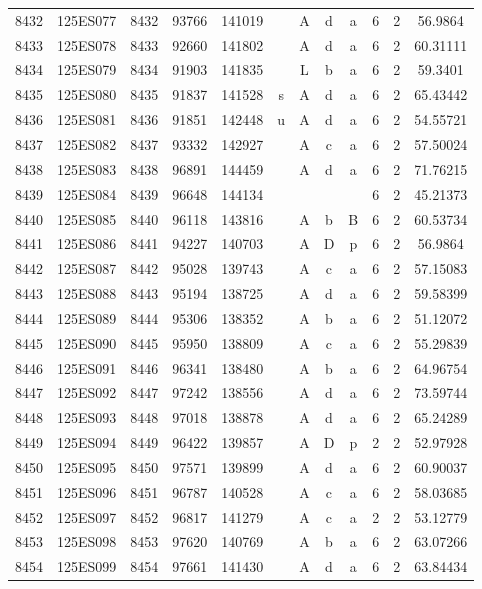 \begin{tabular}{|*{12}{c|}}
8432 & 125ES077 & 8432 & 93766 & 141019 &  & A & d & a & 6 & 2 & 56.9864 \\ 
8433 & 125ES078 & 8433 & 92660 & 141802 &  & A & d & a & 6 & 2 & 60.31111 \\ 
8434 & 125ES079 & 8434 & 91903 & 141835 &  & L & b & a & 6 & 2 & 59.3401 \\ 
8435 & 125ES080 & 8435 & 91837 & 141528 & s & A & d & a & 6 & 2 & 65.43442 \\ 
8436 & 125ES081 & 8436 & 91851 & 142448 & u & A & d & a & 6 & 2 & 54.55721 \\ 
8437 & 125ES082 & 8437 & 93332 & 142927 &  & A & c & a & 6 & 2 & 57.50024 \\ 
8438 & 125ES083 & 8438 & 96891 & 144459 &  & A & d & a & 6 & 2 & 71.76215 \\ 
8439 & 125ES084 & 8439 & 96648 & 144134 &  &  &  &  & 6 & 2 & 45.21373 \\ 
8440 & 125ES085 & 8440 & 96118 & 143816 &  & A & b & B & 6 & 2 & 60.53734 \\ 
8441 & 125ES086 & 8441 & 94227 & 140703 &  & A & D & p & 6 & 2 & 56.9864 \\ 
8442 & 125ES087 & 8442 & 95028 & 139743 &  & A & c & a & 6 & 2 & 57.15083 \\ 
8443 & 125ES088 & 8443 & 95194 & 138725 &  & A & d & a & 6 & 2 & 59.58399 \\ 
8444 & 125ES089 & 8444 & 95306 & 138352 &  & A & b & a & 6 & 2 & 51.12072 \\ 
8445 & 125ES090 & 8445 & 95950 & 138809 &  & A & c & a & 6 & 2 & 55.29839 \\ 
8446 & 125ES091 & 8446 & 96341 & 138480 &  & A & b & a & 6 & 2 & 64.96754 \\ 
8447 & 125ES092 & 8447 & 97242 & 138556 &  & A & d & a & 6 & 2 & 73.59744 \\ 
8448 & 125ES093 & 8448 & 97018 & 138878 &  & A & d & a & 6 & 2 & 65.24289 \\ 
8449 & 125ES094 & 8449 & 96422 & 139857 &  & A & D & p & 2 & 2 & 52.97928 \\ 
8450 & 125ES095 & 8450 & 97571 & 139899 &  & A & d & a & 6 & 2 & 60.90037 \\ 
8451 & 125ES096 & 8451 & 96787 & 140528 &  & A & c & a & 6 & 2 & 58.03685 \\ 
8452 & 125ES097 & 8452 & 96817 & 141279 &  & A & c & a & 2 & 2 & 53.12779 \\ 
8453 & 125ES098 & 8453 & 97620 & 140769 &  & A & b & a & 6 & 2 & 63.07266 \\ 
8454 & 125ES099 & 8454 & 97661 & 141430 &  & A & d & a & 6 & 2 & 63.84434 \\ 

\end{tabular}
